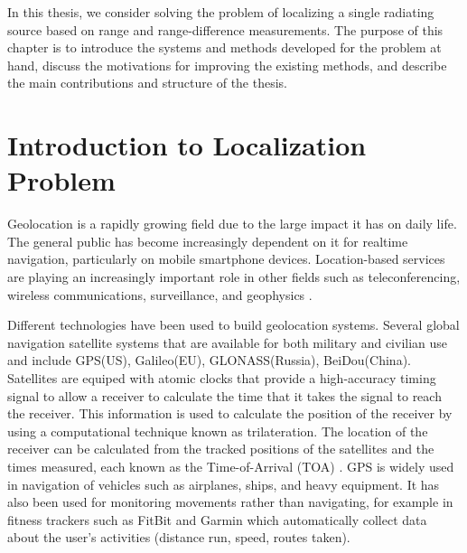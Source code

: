 \label{chapter:introduction}


In this thesis, we consider solving the   problem of localizing a single radiating source based on range and range-difference measurements. The purpose of this chapter is to introduce the systems and methods developed for the problem at hand, discuss the motivations for improving the existing methods, and describe the main contributions and structure of the thesis.

\section{Introduction to Localization Problem} \label{problem}

Geolocation is a rapidly growing field due to the large impact it has on daily life.  The general public has become increasingly dependent on it for realtime navigation, particularly on mobile smartphone devices. Location-based services are  playing an increasingly important role in other fields such as teleconferencing, wireless communications, surveillance, and geophysics \cite{SmithAbel, ShcauRob, Yao, Huang, CheungChan, LiHu, Cheung, Sayed, classMDS}.

Different technologies have been used to build geolocation systems. Several global navigation satellite systems that are available for both military and civilian use and include GPS(US), Galileo(EU), GLONASS(Russia), BeiDou(China). Satellites are equiped with atomic clocks that provide a high-accuracy timing signal to  allow a receiver to calculate the time that it takes the signal to reach the receiver. This information is used to calculate the position of the receiver by using a  computational technique known as trilateration. The location of the receiver can be calculated from the
tracked positions of the satellites and the times measured, each known as the Time-of-Arrival (TOA) \cite{GeoLoc}.
%
 GPS is widely used in navigation of vehicles such as airplanes, ships, and heavy equipment. It has also been used for monitoring movements rather than navigating, for example in fitness trackers such as FitBit \cite{FB} and Garmin\cite{Garmin} which automatically collect data about the user's activities (distance run, speed, routes taken).
 

